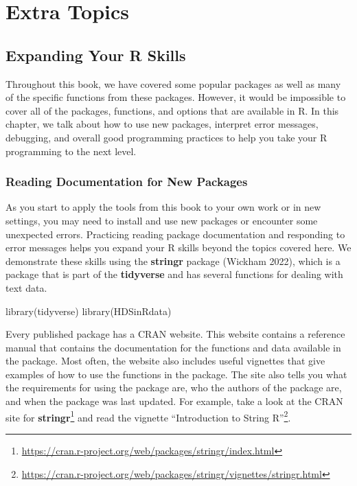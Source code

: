 \documentclass[
  letterpaper,
]{latex/krantz}
\makeatletter
\newenvironment{Shaded}{\begin{snugshade}}{\end{snugshade}}
\newcommand{\FunctionTok}[1]{\textcolor[rgb]{0.28,0.35,0.67}{#1}}
\newcommand{\NormalTok}[1]{\textcolor[rgb]{0.00,0.23,0.31}{#1}}
\renewcommand{\href}[2]{#2\footnote{\url{#1}}}
\newenvironment{kframe}{%
\medskip{}
\setlength{\fboxsep}{.8em}
 \def\at@end@of@kframe{}%
 \ifinner\ifhmode%
  \def\at@end@of@kframe{\end{minipage}}%
  \begin{minipage}{\columnwidth}%
 \fi\fi%
 \def\FrameCommand##1{\hskip\@totalleftmargin \hskip-\fboxsep
 \colorbox{shadecolor}{##1}\hskip-\fboxsep
     \hskip-\linewidth \hskip-\@totalleftmargin \hskip\columnwidth}%
 \MakeFramed {\advance\hsize-\width
   \@totalleftmargin\z@ \linewidth\hsize
   \@setminipage}}%
 {\par\unskip\endMakeFramed%
 \at@end@of@kframe}
\renewenvironment{Shaded}{\begin{kframe}}{\end{kframe}}
\makeatother
\begin{document}
\part{Extra Topics}

\chapter{Expanding Your R Skills}\label{sec-expanding-skills}

Throughout this book, we have covered some popular packages as well as
many of the specific functions from these packages. However, it would be
impossible to cover all of the packages, functions, and options that are
available in R. In this chapter, we talk about how to use new packages,
interpret error messages, debugging, and overall good programming
practices to help you take your R programming to the next level.

\section{\texorpdfstring{Reading Documentation for New Packages
}{Reading Documentation for New Packages }}\label{reading-documentation-for-new-packages}

As you start to apply the tools from this book to your own work or in
new settings, you may need to install and use new packages or encounter
some unexpected errors. Practicing reading package documentation and
responding to error messages helps you expand your R skills beyond the
topics covered here. We demonstrate these skills using the
\textbf{stringr} package (Wickham 2022), which
is a package that is part of the \textbf{tidyverse} and has several
functions for dealing with text data.

\begin{Shaded}
\begin{Highlighting}[]
\FunctionTok{library}\NormalTok{(tidyverse)}
\FunctionTok{library}\NormalTok{(HDSinRdata)}
\end{Highlighting}
\end{Shaded}

Every published package has a CRAN website. This website
contains a reference manual that contains the documentation for the
functions and data available in the package. Most often, the website
also includes useful vignettes that give examples of how to use the
functions in the package. The site also tells you what the requirements
for using the package are, who the authors of the package are, and when
the package was last updated. For example, take a look at the CRAN site
for
\href{https://cran.r-project.org/web/packages/stringr/index.html}{\textbf{stringr}}
and read the vignette
\href{https://cran.r-project.org/web/packages/stringr/vignettes/stringr.html}{``Introduction
to String R''}.
\end{document}
